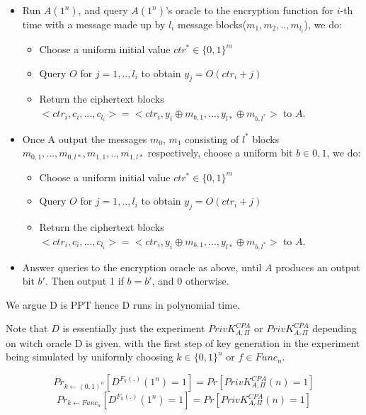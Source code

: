 \documentclass[onecolumn,oneside]{SUSTechHomework}
\begin{document}
  \begin{itemize}
    \item Run $A(1^n)$, and query $A(1^n)$'s oracle to the encryption function for $i$-th time with a message made up by $l_i$ message blocks($m_1, m_2,..,m_{l_i}$), we do:
    \begin{itemize}
      \item Choose a uniform initial value $ctr^* \in \{0,1\}^m$
      \item Query $O$ for $j=1,..,l_i$ to obtain $y_j=O(ctr_i+j)$
      \item Return the ciphertext blocks $<ctr_i,c_i,...,c_{l_i}>=<ctr_i, y_i \oplus m_{b,1},...,y_{l*} \oplus m_{b,l^*}>$ to $A$.
    \end{itemize} 
    \item Once A output the messages $m_0$, $m_1$ consisting of $l^*$ blocks $m_{0,1},...,m_{0,l*},m_{1,1},..,m_{1,l*}$ respectively, choose a uniform bit $b \in {0,1}$, we do:
    \begin{itemize}
      \item Choose a uniform initial value $ctr^* \in \{0,1\}^m$
      \item Query $O$ for $j=1,..,l_i$ to obtain $y_j=O(ctr_i+j)$
      \item Return the ciphertext blocks $<ctr_i,c_i,...,c_{l_i}>=<ctr_i, y_i \oplus m_{b,1},...,y_{l*} \oplus m_{b,l^*}>$ to $A$.
    \end{itemize}
    \item Answer queries to the encryption oracle as above, until $A$ produces an
    output bit $b'$. Then output 1 if $b=b'$, and 0 otherwise.
  \end{itemize}

  We argue D is PPT hence D runs in polynomial time.

  Note that $D$ is essentially just the experiment $PrivK_{A,\Pi}^{CPA}$ or $PrivK_{A,\widetilde{}{\Pi}}^{CPA}$ depending on witch oracle D is given.
  with the first step of key generation in the experiment being simulated by uniformly choosing $k \in \{0,1\}^n$ or $f \in Func_n$.

  $$Pr_{k \leftarrow (0,1)^n}[D^{F_k(.)}(1^n)=1]=Pr[PrivK_{A,\Pi}^{CPA}(n)=1]$$
  $$Pr_{k \leftarrow Func_n}[D^{F_k(.)}(1^n)=1]=Pr[PrivK_{A,\widetilde{}{\Pi}}^{CPA}(n)=1]$$

  \section{}
\end{document}
